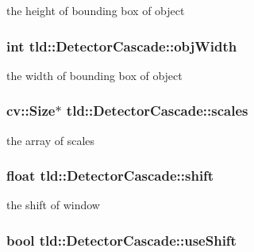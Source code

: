 the height of bounding box of object 

\hypertarget{classtld_1_1DetectorCascade_a1c7a7fddb085fca4577779110637c5c8}{
\subsubsection[{obj\-Width}]{\setlength{\rightskip}{0pt plus 5cm}int tld\-::\-Detector\-Cascade\-::obj\-Width}}\label{classtld_1_1DetectorCascade_a1c7a7fddb085fca4577779110637c5c8}


the width of bounding box of object 

\hypertarget{classtld_1_1DetectorCascade_a5a155eb168c826b143e8619e05a4e90d}{
\subsubsection[{scales}]{\setlength{\rightskip}{0pt plus 5cm}cv\-::\-Size$\ast$ tld\-::\-Detector\-Cascade\-::scales\hspace{0.3cm}{\ttfamily [private]}}}\label{classtld_1_1DetectorCascade_a5a155eb168c826b143e8619e05a4e90d}


the array of scales 

\hypertarget{classtld_1_1DetectorCascade_a18b12b643d662cc9c8850c963079233c}{
\subsubsection[{shift}]{\setlength{\rightskip}{0pt plus 5cm}float tld\-::\-Detector\-Cascade\-::shift}}\label{classtld_1_1DetectorCascade_a18b12b643d662cc9c8850c963079233c}


the shift of window 

\hypertarget{classtld_1_1DetectorCascade_a2549b35ac099860f20a13ef830081bbb}{
\subsubsection[{use\-Shift}]{\setlength{\rightskip}{0pt plus 5cm}bool tld\-::\-Detector\-Cascade\-::use\-Shift}}\label{classtld_1_1DetectorCascade_a2549b35ac099860f20a13ef830081bbb}


